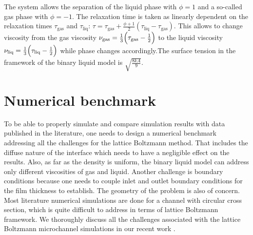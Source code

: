 \documentclass{CFD2011}
\begin{document}
The system allows the separation of the liquid
phase with $\phi=1$ and a so-called gas phase with $\phi=-1$. The
relaxation time is taken as linearly dependent on the relaxation
times $\tau_{\mathrm{gas}}$ and $\tau_{\mathrm{liq}}$:
$\tau=\tau_{\mathrm{gas}}+\frac{\phi+1}{2}(\tau_{\mathrm{liq}}-\tau_{\mathrm{gas}})$. This allows
to change viscosity from the gas viscosity
$\nu_{\mathrm{gas}}=\frac{1}{3}\Bigl(\tau_{\mathrm{gas}}-\frac{1}{2}\Bigr)$ to the liquid viscosity
$\nu_{\mathrm{liq}}=\frac{1}{3}\Bigl(\tau_{\mathrm{liq}}-\frac{1}{2}\Bigr)$ while phase changes
accordingly.The surface tension in the framework of the binary liquid model is $\sqrt{\frac{8 k
A}{9}}$.

\section{Numerical benchmark}
To be able to properly simulate and compare simulation results with data
published in the literature, one needs to design a numerical benchmark addressing
all the challenges for the lattice Boltzmann method. That includes the diffuse nature of the
interface which needs to have a negligible effect on the results. Also, as far as the density is
uniform, the binary liquid model can address only different viscosities of gas and liquid.
Another challenge is boundary conditions because one needs to couple inlet and outlet
boundary conditions \cite{heil-threedim} for the film thickness to establish.  The geometry of
the problem is also of concern. Most literature numerical simulations are done for a channel with
circular cross section,
which is quite difficult to address in terms of lattice Boltzmann framework. We thoroughly discuss
all the
challenges associated with the lattice Boltzmann microchannel simulations in our recent work
\cite{kuzmin-binary2d}. 
\end{document}

